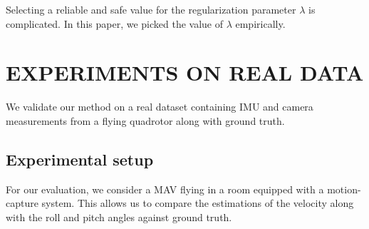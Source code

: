 \documentclass[letterpaper, 10 pt, journal, final]{ieeeconf}  %
\begin{document}
Selecting a reliable and safe value for the regularization parameter $\lambda$ is complicated.
In this paper, we picked the value of $\lambda$ empirically.

\section{EXPERIMENTS ON REAL DATA}\label{SectionPerformance}

We validate our method on a real dataset containing IMU and camera measurements from a flying quadrotor along with ground truth.

\subsection{Experimental setup}\label{SubsectionSetup}

For our evaluation, we consider a MAV flying in a room equipped with a motion-capture system.
This allows us to compare the estimations of the velocity along with the roll and pitch angles against ground truth.
\end{document}
